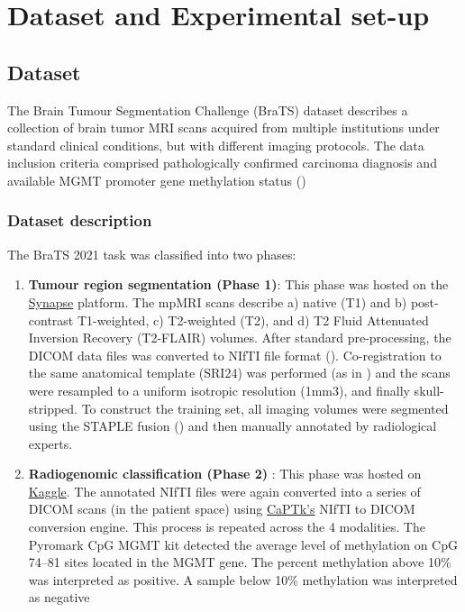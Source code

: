 \chapter{Dataset and Experimental set-up}
\ifpdf
    \graphicspath{{Experimental/Chapter2Figs/PNG/}{Experimental/Chapter2Figs/PDF/}{Experimental/Chapter2Figs/}}
\else
    \graphicspath{{Experimental/Chapter2Figs/EPS/}{Experimental/Chapter2Figs/}}
\fi

\section{Dataset}


The Brain Tumour Segmentation Challenge (BraTS) dataset describes a collection of brain tumor MRI scans acquired from multiple institutions under standard clinical conditions, but with different imaging protocols. The data inclusion criteria comprised pathologically confirmed carcinoma diagnosis and
available MGMT promoter gene methylation status (\cite{Brats})

\subsection{Dataset description}

\vspace*{3mm} 
The BraTS 2021 task was classified into two phases:
\begin{enumerate}
    \item \textbf{Tumour region segmentation (Phase 1)}: This phase was hosted on the \href{https://www.synapse.org/#!Synapse:syn27046444/wiki/616571}{Synapse} platform. The mpMRI scans describe a) native (T1) and b) post-contrast T1-weighted, c) T2-weighted (T2), and d) T2 Fluid Attenuated Inversion Recovery (T2-FLAIR) volumes. After standard pre-processing, the DICOM data files was converted to NIfTI file format (\cite{seg_1}). Co-registration to the same anatomical template (SRI24) was performed (as in \cite{seg_2}) and the scans were resampled to a uniform isotropic resolution (1mm3), and finally skull-stripped. To construct the training set, all imaging volumes were segmented using the STAPLE fusion (\cite{seg_3}) and then manually annotated by radiological experts. 

    \item \textbf{Radiogenomic classification (Phase 2)} : This phase was hosted on \href{https://www.kaggle.com/competitions/rsna-miccai-brain-tumor-radiogenomic-classification/overview}{Kaggle}. The annotated NIfTI files were again converted into a series of DICOM scans (in the patient space) using \href{https://cbica.github.io/CaPTk/}{CaPTk’s} NIfTI to DICOM conversion engine. This process is repeated across the 4 modalities. The Pyromark CpG MGMT kit detected the average level of methylation on CpG 74–81 sites located in the MGMT gene. The percent methylation above 10\% was interpreted as positive. A sample below 10\% methylation was interpreted as negative
\end{enumerate}

